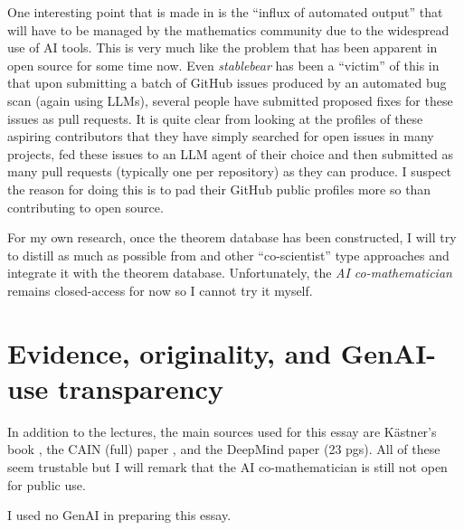 \documentclass[a4paper,11pt]{article}
\begin{document}
One interesting point that is made in \cite{zheng2026ai} is the ``influx of automated output'' that will have to be managed by the mathematics community due to the widespread use of AI tools. This is very much like the problem that has been apparent in open source for some time now. Even \emph{stablebear} has been a ``victim'' of this in that upon submitting a batch of GitHub issues produced by an automated bug scan (again using LLMs), several people have submitted proposed fixes for these issues as pull requests. It is quite clear from looking at the profiles of these aspiring contributors that they have simply searched for open issues in many projects, fed these issues to an LLM agent of their choice and then submitted as many pull requests (typically one per repository) as they can produce. I suspect the reason for doing this is to pad their GitHub public profiles more so than contributing to open source.

For my own research, once the theorem database has been constructed, I will try to distill as much as possible from \cite{zheng2026ai} and other ``co-scientist'' type approaches and integrate it with the theorem database. Unfortunately, the \emph{AI co-mathematician} remains closed-access for now so I cannot try it myself.

\section{Evidence, originality, and GenAI-use transparency}

In addition to the lectures, the main sources used for this essay are K\"{a}stner's book \cite{kastner2025machine}, the CAIN (full) paper \cite{herbold2024legal}, and the DeepMind paper \cite{zheng2026ai} (23 pgs). All of these seem trustable but I will remark that the AI co-mathematician is still not open for public use.

I used no GenAI in preparing this essay.

\medskip

\printbibliography
\end{document}
